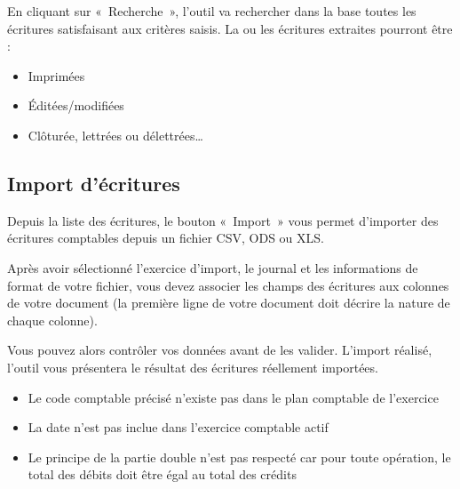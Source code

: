 \documentclass[a4paper,10pt,oneside,french]{sphinxmanual}
\begin{document}
\sphinxAtStartPar
En cliquant sur « Recherche », l’outil va rechercher dans la base toutes les écritures satisfaisant aux critères saisis.
La ou les écritures extraites pourront être :
\begin{itemize}
\item {} 
\sphinxAtStartPar
Imprimées

\item {} 
\sphinxAtStartPar
Éditées/modifiées

\item {} 
\sphinxAtStartPar
Clôturée, lettrées ou délettrées…

\end{itemize}


\subsection{Import d’écritures}
\label{\detokenize{accounting/entity:import-d-ecritures}}
\sphinxAtStartPar
Depuis la liste des écritures, le bouton « Import » vous permet d’importer des écritures comptables depuis un fichier CSV, ODS ou XLS.

\sphinxAtStartPar
Après avoir sélectionné l’exercice d’import, le journal et les informations de format de votre fichier, vous devez associer les champs des écritures aux colonnes de votre document (la première ligne de votre document doit décrire la nature de chaque colonne).
\begin{quote}

\noindent{}
\end{quote}

\sphinxAtStartPar
Vous pouvez alors contrôler vos données avant de les valider.
L’import réalisé, l’outil vous présentera le résultat des écritures réellement importées.

\sphinxAtStartPar
{}
\begin{itemize}
\item {} 
\sphinxAtStartPar
Le code comptable précisé n’existe pas dans le plan comptable de l’exercice

\item {} 
\sphinxAtStartPar
La date n’est pas inclue dans l’exercice comptable actif

\item {} 
\sphinxAtStartPar
Le principe de la partie double n’est pas respecté car pour toute opération, le total des débits doit être égal au total des crédits

\end{itemize}
\end{document}
